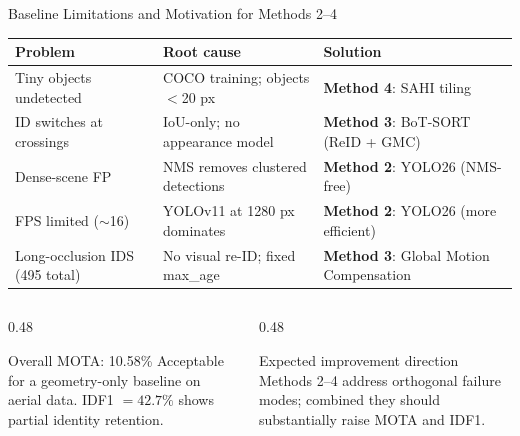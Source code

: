 \documentclass[aspectratio=169]{beamer}
\begin{document}
\begin{frame}{Baseline Limitations and Motivation for Methods 2--4}
  \renewcommand{\arraystretch}{1.3}
  \small
  \begin{tabular}{p{3.0cm}p{4.0cm}p{4.5cm}}
    \toprule
    \textbf{Problem} & \textbf{Root cause}                           & \textbf{Solution} \\
    \midrule
    Tiny objects undetected
                     & COCO training; objects $<$20 px
                     & \textbf{Method 4}: SAHI tiling                                    \\
    ID switches at crossings
                     & IoU-only; no appearance model
                     & \textbf{Method 3}: BoT-SORT (ReID + GMC)                          \\
    Dense-scene FP
                     & NMS removes clustered detections
                     & \textbf{Method 2}: YOLO26 (NMS-free)                              \\
    FPS limited ($\sim$16)
                     & YOLOv11 at 1280 px dominates
                     & \textbf{Method 2}: YOLO26 (more efficient)                        \\
    Long-occlusion IDS (495 total)
                     & No visual re-ID; fixed max\_age
                     & \textbf{Method 3}: Global Motion Compensation                     \\
    \bottomrule
  \end{tabular}
  \vspace{0.4em}
  \begin{columns}[T]
    \begin{column}{0.48\textwidth}
      \begin{block}{Overall MOTA: 10.58\%}
        \small Acceptable for a geometry-only baseline on aerial data.
        IDF1 $=42.7\%$ shows partial identity retention.
      \end{block}
    \end{column}
    \begin{column}{0.48\textwidth}
      \begin{alertblock}{Expected improvement direction}
        \small Methods 2--4 address orthogonal failure modes;
        combined they should substantially raise MOTA and IDF1.
      \end{alertblock}
    \end{column}
  \end{columns}
\end{frame}
\end{document}
